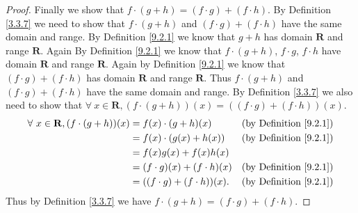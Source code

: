 \begin{proof}
    Finally we show that \(f \cdot (g + h) = (f \cdot g) + (f \cdot h)\).
    By Definition \ref{3.3.7} we need to show that \(f \cdot (g + h)\) and \((f \cdot g) + (f \cdot h)\) have the same domain and range.
    By Definition \ref{9.2.1} we know that \(g + h\) has domain \(\mathbf{R}\) and range \(\mathbf{R}\).
    Again By Definition \ref{9.2.1} we know that \(f \cdot (g + h)\), \(f \cdot g\), \(f \cdot h\) have domain \(\mathbf{R}\) and range \(\mathbf{R}\).
    Again by Definition \ref{9.2.1} we know that \((f \cdot g) + (f \cdot h)\) has domain \(\mathbf{R}\) and range \(\mathbf{R}\).
    Thus \(f \cdot (g + h)\) and \((f \cdot g) + (f \cdot h)\) have the same domain and range.
    By Definition \ref{3.3.7} we also need to show that \(\forall\ x \in \mathbf{R}, (f \cdot (g + h))(x) = ((f \cdot g) + (f \cdot h))(x)\).
    \begin{align*}
        \forall\ x \in \mathbf{R}, (f \cdot (g + h))(x) & = f(x) \cdot (g + h)(x)           & \text{(by Definition \ref{9.2.1})} \\
                                                        & = f(x) \cdot (g(x) + h(x))        & \text{(by Definition \ref{9.2.1})} \\
                                                        & = f(x)g(x) + f(x)h(x)                                                  \\
                                                        & = (f \cdot g)(x) + (f \cdot h)(x) & \text{(by Definition \ref{9.2.1})} \\
                                                        & = ((f \cdot g) + (f \cdot h))(x). & \text{(by Definition \ref{9.2.1})}
    \end{align*}
    Thus by Definition \ref{3.3.7} we have \(f \cdot (g + h) = (f \cdot g) + (f \cdot h)\).
\end{proof}